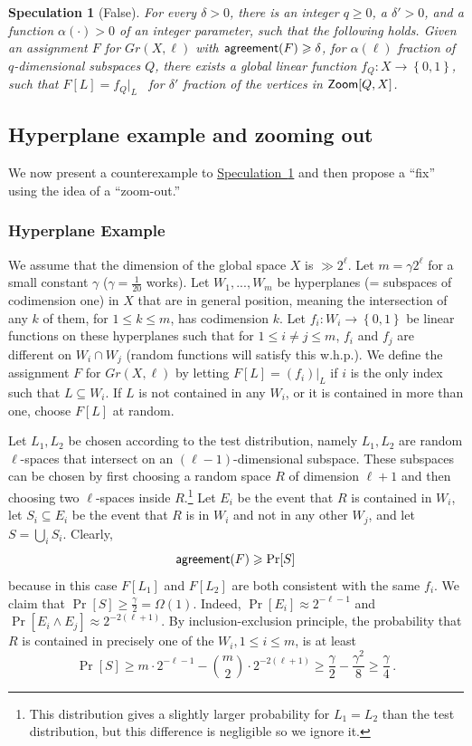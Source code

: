 \documentclass[11pt]{article}
\numberwithin{equation}{section}
\theoremstyle{definition}
\theoremstyle{plain}
\newcommand{\expref}[2]{\hyperref[#2]{#1~\ref{#2}}}
\newtheorem{spec}[theorem]{Speculation}
\newcommand\set[1]{{\left\{ #1 \right\}}}
\renewcommand\geq{\geqslant}
\renewcommand\ge{\geqslant}
\renewcommand\leq{\leqslant}
\renewcommand\subset{\subseteq}
\newcommand{\Zoom}{{\sf Zoom}}
\def\agr{{\sf agreement}}
\begin{document}
\begin{spec}[False]\label{spec:2} For every %
 $\delta>0$, there
  is an integer $q \geq 0$, a
   $\delta' > 0$, and a function
 $\alpha(\cdot) > 0$ of an integer parameter,
 such that
the following holds. Given an assignment $F$ for $Gr(X,\ell)$ with $\agr(F)\ge\delta$, for $\alpha(\ell)$ fraction of $q$-dimensional subspaces $Q$,
there exists a global linear function $f_Q \colon X \to \set{0,1}$,
such that $F[L] = f_Q|_L$ ~for $\delta'$
fraction of the vertices in ${\Zoom}[Q, X]$.
\end{spec}


%
\subsection{Hyperplane example and zooming out}  %
\label{sec:counter-2}

We now present a counterexample to \expref{Speculation}{spec:2} and then propose a ``fix'' using the idea of a ``zoom-out.''

\subsubsection*{Hyperplane Example}
We assume that the dimension of the global space $X$ is $\gg 2^\ell$.
Let $m = \gamma 2^{\ell}$ for a small constant $\gamma$
($\gamma = \frac{1}{20}$ works). Let $W_1,...,W_{m}$ be hyperplanes (=
subspaces of codimension one) in $X$ that are in general position,
meaning the intersection of any $k$ of them, for $1 \leq k \leq m$,
has codimension $k$.  Let $f_i\colon W_i\to\set{0,1}$ be linear
functions on these hyperplanes such that for $1 \leq i\not=j \leq m$,
$f_i$ and $f_j$ are different on $W_i \cap W_j$ (random functions will
satisfy this w.h.p.).  We define the assignment $F$ for $Gr(X,\ell)$
by letting $F[L] = (f_i)|_{L}$ if $i$ is the only index such
that $L\subset W_i$. If $L$ is not contained in any $W_i$, or it is
contained in more than one, choose $F[L]$ at random.

Let $L_1,L_2$ be chosen according to the test distribution, namely $L_1,L_2$ are  random $\ell$-spaces that intersect on an
$(\ell-1)$-dimensional subspace. These subspaces can be chosen by first choosing a random space $R$ of dimension $\ell+1$ and then choosing two $\ell$-spaces inside $R$.\footnote{This distribution gives a slightly larger probability for $L_1=L_2$ than the test distribution, but this difference is negligible so we ignore it.}
Let $E_i$ be the event that $R$ is contained in $W_i$, let $S_i\subset E_i$ be the event that $R$ is in $W_i$ and not in any other $W_j$, and let $S = \bigcup_i S_i$. Clearly, \[\agr(F) \ge \Pr[S] \]
because in this case $F[L_1]$ and $F[L_2]$ are both consistent with the same $f_i$.
We claim that $\Pr[S]\ge \frac{\gamma}{2} = \Omega(1)$. Indeed, $\Pr[E_i] \approx 2^{-\ell-1}$ and $\Pr[E_i \wedge E_j]\approx 2^{-2(\ell+1)}$. By inclusion-exclusion principle, the probability that $R$ is contained in precisely one of the
$W_i, 1 \leq i \leq m$, is at least
 \[
 \Pr[S] \ge m \cdot 2^{-\ell-1}  - {m \choose 2} \cdot 2^{-2(\ell+1)} \ge \frac{\gamma}{2} - \frac{\gamma^2}{8} \geq \frac{\gamma}{4}
 \,.
 \]
\end{document}
